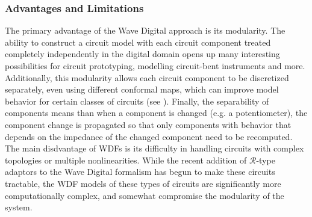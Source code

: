 \documentclass[twoside,a4paper]{article}
\begin{document}
\subsubsection{Advantages and Limitations}
The primary advantage of the Wave Digital approach is its modularity.
The ability to construct a circuit model with each circuit component
treated completely independently in the digital domain opens up many
interesting possibilities for circuit prototyping, modelling circuit-bent
instruments and more. Additionally, this modularity allows each circuit
component to be discretized separately, even using different conformal
maps, which can improve model behavior for certain classes of circuits
(see \cite{Germain}). Finally, the separability of components means than
when a component is changed (e.g. a potentiometer), the component change
is propagated so that only components with behavior that depends on the
impedance of the changed component need to be recomputed.
\newline\newline
The main disdvantage of WDFs is its difficulty in handling circuits with
complex topologies or multiple nonlinearities. While the recent addition
of $\mathcal{R}$-type adaptors to the Wave Digital formalism \cite{KurtThesis}
has begun to make these circuits tractable, the WDF models of these types of
circuits are significantly more computationally complex, and somewhat
compromise the modularity of the system.
\end{document}
